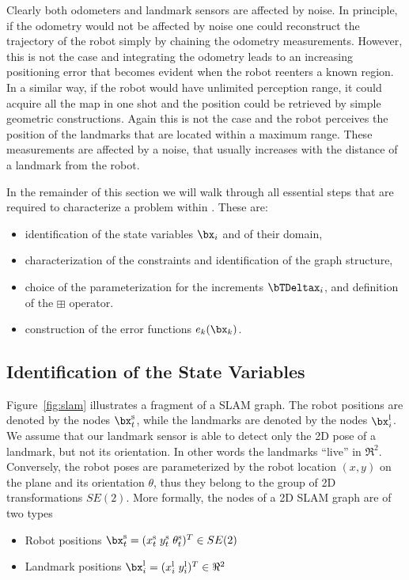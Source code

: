 \documentclass[a4paper]{article}
\begin{document}
Clearly both odometers and landmark sensors are affected by noise.  In
principle, if the odometry would not be affected by noise one could
reconstruct the trajectory of the robot simply by chaining the
odometry measurements. However, this is not the case and integrating
the odometry leads to an increasing positioning error that becomes
evident when the robot reenters a known region. In a similar way,
if the robot would have unlimited perception range, it could acquire
all the map in one shot and the position could be retrieved by simple
geometric constructions. Again this is not the case and the robot
perceives the position of the landmarks that are located within a
maximum range. These measurements are affected by a noise, that
usually increases with the distance of a landmark from the robot.

In the remainder of this section we will walk through all essential
steps that are required to characterize a problem within \gopt{}.
These are:
\begin{itemize}
\item identification of the state variables $\bx_i$ and of their domain,
\item characterization of the constraints and identification of the graph structure,
\item choice of the parameterization for the increments $\bTDeltax_i$, and definition of the
$\boxplus$ operator.
\item construction of the error functions $e_k(\bx_k)$.
\end{itemize}

\subsection{Identification of the State Variables}
Figure~\ref{fig:slam} illustrates a fragment of a SLAM graph.  The
robot positions are denoted by the nodes $\bx^\mathrm{s}_t$, while the
landmarks are denoted by the nodes $\bx^\mathrm{l}_i$. We assume that
our landmark sensor is able to detect only the 2D pose of a landmark,
but not its orientation.  In other words the landmarks ``live'' in
$\Re^2$.  Conversely, the robot poses are parameterized by the robot
location $(x,y)$ on the plane and its orientation $\theta$, thus they
belong to the group of 2D transformations $SE(2)$.  More
formally, the nodes of a 2D SLAM graph are of two types
\begin{itemize}
\item Robot positions $\bx^\mathrm{s}_t = ( x^\mathrm{s}_t  \; y^\mathrm{s}_t \; \theta^\mathrm{s}_t)^T \in SE(2)$
\item Landmark positions $\bx^\mathrm{l}_i = ( x^\mathrm{l}_i  \; y^\mathrm{l}_i )^T \in \Re^2$
\end{itemize}
\end{document}
